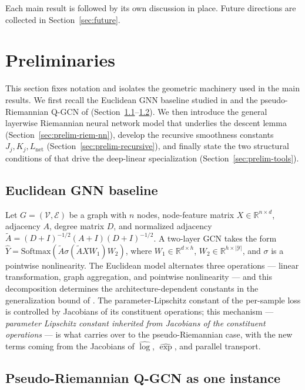 \documentclass[letterpaper]{article}
\newcommand{\R}{\mathbb{R}}
\begin{document}
Each main result is followed by its own discussion in place. Future
directions are collected in Section~\ref{sec:future}.

\section{Preliminaries}
\label{sec:prelim}

This section fixes notation and isolates the geometric machinery used in
the main results. We first recall the Euclidean GNN baseline studied in
\cite{tang2023towards} and the pseudo-Riemannian Q-GCN of
\cite{xiong2022pseudo} (Section~\ref{sec:eucl-gnn}--\ref{sec:prelim-qgcn}).
We then introduce the general layerwise Riemannian neural network model
that underlies the descent lemma (Section~\ref{sec:prelim-riem-nn}),
develop the recursive smoothness constants $J_j, K_j, L_{\mathrm{net}}$
(Section~\ref{sec:prelim-recursive}), and finally state the two structural
conditions of \cite{arora2018convergence} that drive the deep-linear
specialization (Section~\ref{sec:prelim-tools}).

\subsection{Euclidean GNN baseline}
\label{sec:eucl-gnn}

Let $G = (\mathcal V, \mathcal E)$ be a graph with $n$ nodes, node-feature
matrix $X \in \R^{n \times d}$, adjacency $A$, degree matrix $D$, and
normalized adjacency $\tilde A = (D+I)^{-1/2}(A+I)(D+I)^{-1/2}$. A two-layer
GCN takes the form
$\hat Y = \mathrm{Softmax}(\tilde A \sigma(\tilde A X W_1) W_2)$,
where $W_1 \in \R^{d \times h}$, $W_2 \in \R^{h \times |\mathcal Y|}$, and
$\sigma$ is a pointwise nonlinearity. The Euclidean model alternates three
operations — linear transformation, graph aggregation, and pointwise
nonlinearity — and this decomposition determines the architecture-dependent
constants in the generalization bound of \cite{tang2023towards}. The
parameter-Lipschitz constant of the per-sample loss is controlled by
Jacobians of its constituent operations; this mechanism — \emph{parameter
Lipschitz constant inherited from Jacobians of the constituent
operations} — is what carries over to the pseudo-Riemannian case, with the
new terms coming from the Jacobians of $\widehat{\log}$, $\widehat{\exp}$,
and parallel transport.
\subsection{Pseudo-Riemannian Q-GCN as one instance}
\label{sec:prelim-qgcn}
\end{document}

